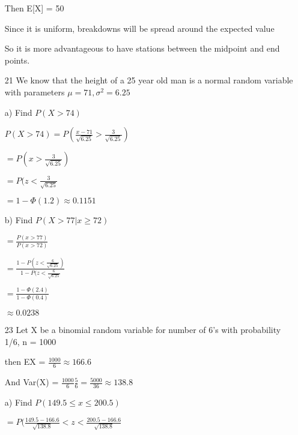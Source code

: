 \documentclass[12pt]{article}
\begin{document}
\begin{itemize}
  Then E[X] = 50

  Since it is uniform, breakdowns will be spread around the expected value

  So it is more advantageous to have stations between the midpoint and end points.








\item[21]
  We know that the height of a 25 year old man is a normal random variable with parameters $\mu = 71, \sigma ^2 = 6.25$

  a) Find $P(X > 74)$

  $P(X > 74) = P(\frac{x - 71}{\sqrt{6.25}} > \frac{3}{\sqrt{6.25}})$

  $=P(x > \frac{3}{\sqrt{6.25}})$

  $=P(z < \frac{3}{\sqrt{6.25}}$

  $=1 - \Phi (1.2) \approx 0.1151$

  b) Find $P(X > 77 | x \geq 72)$

  $= \frac{P(x > 77)}{P(x > 72)}$

  $= \frac{ 1 - P(z < \frac{6}{\sqrt{6.25}})}{1 - P(z < \frac{6}{\sqrt{6.25}}}$

  $= \frac{ 1 - \Phi(2.4)}{1 - \Phi(0.4)}$

  $\approx 0.0238$
\item[23]
  Let X be a binomial random variable for number of 6's with probability 1/6, n = 1000

  then EX = $\frac{1000}{6} \approx 166.6$

  And Var(X) = $\frac{1000}{6} \frac{5}{6} = \frac{5000}{36} \approx 138.8$

  a) Find $P(149.5 \leq x \leq 200.5)$

  $= P(\frac{149.5-166.6}{\sqrt{138.8}} < z < \frac{200.5 - 166.6}{\sqrt{138.8}}$


\end{itemize}
\end{document}
